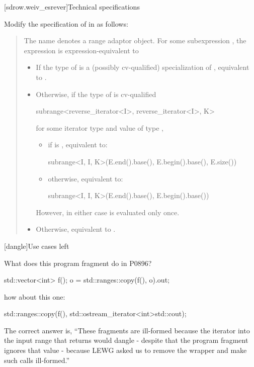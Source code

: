[sdrow.weiv_esrever]{Technical specifications}

Modify the specification of  in
 as follows:

\begin{quote}
\pnum
The name  denotes a
range adaptor object.
For some subexpression , the expression
 is expression-equivalent to\added{:}
\begin{addedblock}
\begin{itemize}
\item If the type of  is a (possibly cv-qualified)
  specialization of , equivalent to .
\item Otherwise, if the type of  is cv-qualified
\begin{codeblock}
subrange<reverse_iterator<I>, reverse_iterator<I>, K>
\end{codeblock}
  for some iterator type  and
  value  of type ,
    \begin{itemize}
    \item if  is , equivalent to:
\begin{codeblock}
subrange<I, I, K>(E.end().base(), E.begin().base(), E.size())
\end{codeblock}
    \item otherwise, equivalent to:
\begin{codeblock}
subrange<I, I, K>(E.end().base(), E.begin().base())
\end{codeblock}
    \end{itemize}
  However, in either case  is evaluated only once.
\item Otherwise, equivalent to .
\end{itemize}
\end{addedblock}
\end{quote}


[dangle]{Use cases left }

What does this program fragment do in P0896?
\begin{codeblock}
std::vector<int> f();
o = std::ranges::copy(f(), o).out;
\end{codeblock}
how about this one:
\begin{codeblock}
std::ranges::copy(f(), std::ostream_iterator<int>{std::cout});
\end{codeblock}
The correct answer is, ``These fragments are ill-formed because the iterator into
the input range that  returns would dangle - despite that
the program fragment ignores that value - because LEWG asked us to remove the
 wrapper and make such calls ill-formed.''

